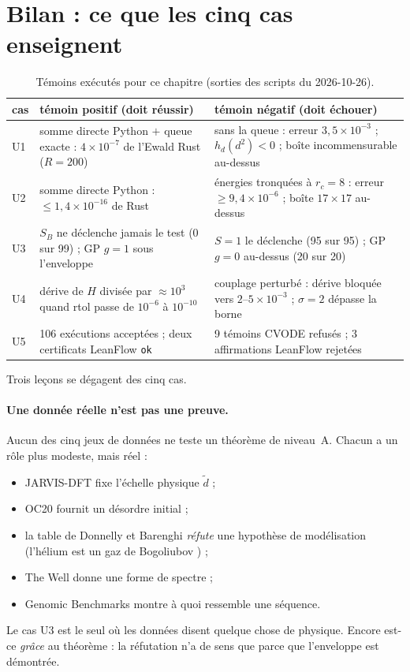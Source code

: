\section{Bilan : ce que les cinq cas enseignent}\label{ch5:bilan}

\begin{table}[ht]\centering\small
\caption{Témoins exécutés pour ce chapitre (sorties des scripts du 2026-10-26).}\label{ch5:tab:temoins}
\begin{tabular}{p{1.4cm}p{6.2cm}p{6.2cm}}\toprule
cas & témoin positif (doit réussir) & témoin négatif (doit échouer)\\\midrule
U1 & somme directe Python $+$ queue exacte : $4\times10^{-7}$ de l'Ewald Rust ($R=200$) &
sans la queue : erreur $3{,}5\times10^{-3}$ ; $h_d(d^2)<0$ ; boîte incommensurable au-dessus\\
U2 & somme directe Python : $\le1{,}4\times10^{-16}$ de Rust &
énergies tronquées à $r_c=8$ : erreur $\ge9{,}4\times10^{-6}$ ; boîte $17\times17$ au-dessus\\
U3 & $S_B$ ne déclenche jamais le test (0 sur 99) ; GP $g=1$ sous l'enveloppe &
$S=1$ le déclenche (95 sur 95) ; GP $g=0$ au-dessus (20 sur 20)\\
U4 & dérive de $H$ divisée par $\approx10^3$ quand rtol passe de $10^{-6}$ à $10^{-10}$ &
couplage perturbé : dérive bloquée vers $2$--$5\times10^{-3}$ ; $\sigma=2$ dépasse la borne\\
U5 & 106 exécutions acceptées ; deux certificats LeanFlow \texttt{ok} &
9 témoins CVODE refusés ; 3 affirmations LeanFlow rejetées\\
\bottomrule\end{tabular}
\end{table}

Trois leçons se dégagent des cinq cas.

\paragraph{Une donnée réelle n'est pas une preuve.} Aucun des cinq jeux de données ne teste un théorème de niveau~A.
Chacun a un rôle plus modeste, mais réel :
\begin{itemize}
\item JARVIS-DFT fixe l'échelle physique $\tilde d$ ;
\item OC20 fournit un désordre initial ;
\item la table de Donnelly et Barenghi \emph{réfute} une hypothèse de modélisation (\og l'hélium est un gaz de
Bogoliubov \fg) ;
\item The Well donne une forme de spectre ;
\item Genomic Benchmarks montre à quoi ressemble une séquence.
\end{itemize}
Le cas U3 est le seul où les données disent quelque chose de physique. Encore est-ce \emph{grâce} au théorème : la
réfutation n'a de sens que parce que l'enveloppe est démontrée.

